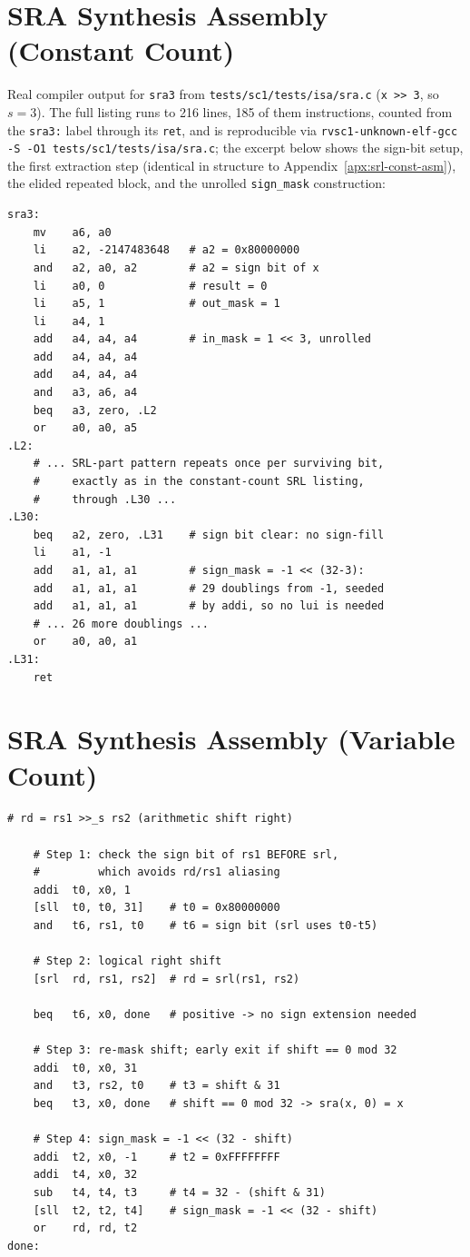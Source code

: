 \chapter{SRA Synthesis Assembly (Constant Count)} \label{apx:sra-const-asm}

Real compiler output for \texttt{sra3} from \nolinkurl{tests/sc1/tests/isa/sra.c} (\texttt{x >> 3}, so
$s = 3$). The full listing runs to 216 lines, 185 of them instructions, counted from the
\texttt{sra3:} label through its \texttt{ret}, and is reproducible via
\nolinkurl{rvsc1-unknown-elf-gcc -S -O1 tests/sc1/tests/isa/sra.c}; the excerpt below shows the sign-bit
setup, the first extraction step (identical in structure to Appendix~\ref{apx:srl-const-asm}), the
elided repeated block, and the unrolled \texttt{sign\_mask} construction:

\begin{lstlisting}
sra3:
    mv    a6, a0
    li    a2, -2147483648   # a2 = 0x80000000
    and   a2, a0, a2        # a2 = sign bit of x
    li    a0, 0             # result = 0
    li    a5, 1             # out_mask = 1
    li    a4, 1
    add   a4, a4, a4        # in_mask = 1 << 3, unrolled
    add   a4, a4, a4
    add   a4, a4, a4
    and   a3, a6, a4
    beq   a3, zero, .L2
    or    a0, a0, a5
.L2:
    # ... SRL-part pattern repeats once per surviving bit,
    #     exactly as in the constant-count SRL listing,
    #     through .L30 ...
.L30:
    beq   a2, zero, .L31    # sign bit clear: no sign-fill
    li    a1, -1
    add   a1, a1, a1        # sign_mask = -1 << (32-3):
    add   a1, a1, a1        # 29 doublings from -1, seeded
    add   a1, a1, a1        # by addi, so no lui is needed
    # ... 26 more doublings ...
    or    a0, a0, a1
.L31:
    ret
\end{lstlisting}


\chapter{SRA Synthesis Assembly (Variable Count)} \label{apx:sra-asm}

\begin{lstlisting}
# rd = rs1 >>_s rs2 (arithmetic shift right)

    # Step 1: check the sign bit of rs1 BEFORE srl,
    #         which avoids rd/rs1 aliasing
    addi  t0, x0, 1
    [sll  t0, t0, 31]    # t0 = 0x80000000
    and   t6, rs1, t0    # t6 = sign bit (srl uses t0-t5)

    # Step 2: logical right shift
    [srl  rd, rs1, rs2]  # rd = srl(rs1, rs2)

    beq   t6, x0, done   # positive -> no sign extension needed

    # Step 3: re-mask shift; early exit if shift == 0 mod 32
    addi  t0, x0, 31
    and   t3, rs2, t0    # t3 = shift & 31
    beq   t3, x0, done   # shift == 0 mod 32 -> sra(x, 0) = x

    # Step 4: sign_mask = -1 << (32 - shift)
    addi  t2, x0, -1     # t2 = 0xFFFFFFFF
    addi  t4, x0, 32
    sub   t4, t4, t3     # t4 = 32 - (shift & 31)
    [sll  t2, t2, t4]    # sign_mask = -1 << (32 - shift)
    or    rd, rd, t2
done:
\end{lstlisting}


